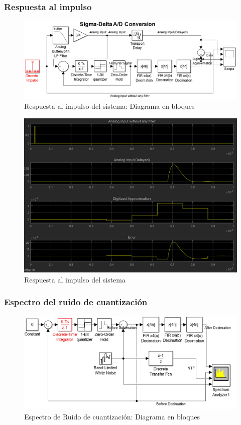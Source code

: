 \documentclass[assd_tp3_main.tex]{subfiles}
\begin{document}
\subsubsection{Respuesta al impulso}

\begin{figure}[H]
\centering
\includegraphics[width=1\linewidth]{images/ej4/impulse_simulink.png}
\caption{Respuesta al impulso del sistema: Diagrama en bloques}
\label{fig:impulse_simulink}
\end{figure}


\begin{figure}[H]
\centering
\includegraphics[width=1\linewidth]{images/ej4/impulse_response.png}
\caption{Respuesta al impulso del sistema}
\label{fig:impulse_response}
\end{figure}

\subsubsection{Espectro del ruido de cuantización}

\begin{figure}[H]
\centering
\includegraphics[width=0.8\linewidth]{images/ej4/noise_simulink.png}
\caption{Espectro de Ruido de cuantización: Diagrama en bloques}
\label{fig:noise_simulink}
\end{figure}
\end{document}
